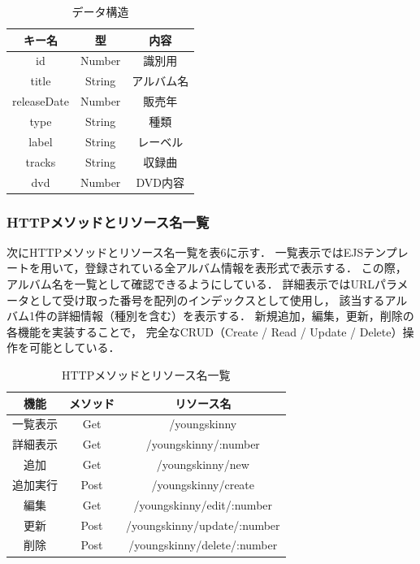 \documentclass[uplatex,dvipdfmx]{jsarticle}
\begin{document}
\begin{table}[H]
    \centering
    \caption{データ構造}
    \label{tab:pulse_comparison}
    \setlength{\extrarowheight}{3pt} 
    \begin{tabular}{|c|c|c|}
        \hline
        キー名 & 型 & 内容 \\
        \hline
        id & Number & 識別用 \\
        \hline
        title & String & アルバム名 \\
        \hline
        releaseDate & Number & 販売年 \\
        \hline
        type & String & 種類 \\
        \hline
        label & String & レーベル \\
        \hline
        tracks & String & 収録曲 \\
        \hline
        dvd & Number & DVD内容 \\
 	\hline
     \end{tabular}
\end{table}

\subsubsection{HTTPメソッドとリソース名一覧}
次にHTTPメソッドとリソース名一覧を表6に示す．
一覧表示ではEJSテンプレートを用いて，登録されている全アルバム情報を表形式で表示する．
この際，アルバム名を一覧として確認できるようにしている．
詳細表示ではURLパラメータとして受け取った番号を配列のインデックスとして使用し，
該当するアルバム1件の詳細情報（種別を含む）を表示する．
新規追加，編集，更新，削除の各機能を実装することで，
完全なCRUD（Create / Read / Update / Delete）操作を可能としている．

\begin{table}[H]
    \centering
    \caption{HTTPメソッドとリソース名一覧}
    \label{tab:pulse_comparison}
    \setlength{\extrarowheight}{3pt} 
    \begin{tabular}{|c|c|c|}
        \hline
        機能 & メソッド & リソース名 \\
        \hline
        一覧表示 & Get & /youngskinny \\
        \hline
        詳細表示 & Get & /youngskinny/:number \\
        \hline
        追加 & Get & /youngskinny/new \\
        \hline
        追加実行 & Post & /youngskinny/create \\
        \hline
        編集 & Get & /youngskinny/edit/:number \\
        \hline
        更新 & Post & /youngskinny/update/:number \\
        \hline
        削除 & Post & /youngskinny/delete/:number \\
        \hline
     \end{tabular}
\end{table}
\end{document}
